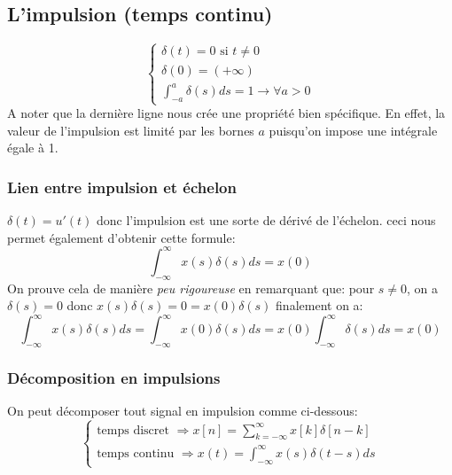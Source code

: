 \documentclass{report}
\begin{document}
\subsection{L'impulsion (temps continu)}
\begin{equation}
\begin{cases}
\delta (t) = 0 \text{ si } t \neq 0\\
\delta (0) = (+\infty)\\
\int_{-a}^a \delta (s) ds = 1 \rightarrow \forall a > 0
\end{cases}
\end{equation}
A noter que la dernière ligne nous crée une propriété bien spécifique. En effet, la valeur de l'impulsion est limité par les bornes $a$ puisqu'on impose une intégrale égale à 1.

\subsubsection{Lien entre impulsion et échelon}
$\delta (t) = u'(t)$ donc l'impulsion est une sorte de dérivé de l'échelon. ceci nous permet également d'obtenir cette formule:
\begin{equation}
\int_{-\infty}^{\infty} x(s) \delta(s)ds = x(0)
\end{equation}
On prouve cela de manière \textit{peu rigoureuse} en remarquant que: pour $s \neq 0$, on a $\delta(s) = 0$ donc $x(s)\delta(s) = 0 = x(0)\delta(s)$ finalement on a:
\begin{equation}
\int_{-\infty}^{\infty} x(s) \delta(s)ds = \int_{-\infty}^{\infty} x(0) \delta(s)ds = x(0) \int_{-\infty}^{\infty} \delta(s)ds = x(0)
\end{equation} 

\subsubsection{Décomposition en impulsions}
On peut décomposer tout signal en impulsion comme ci-dessous:
\begin{equation}
\begin{cases}
\text{temps discret } \Rightarrow x[n] = \sum_{k=-\infty}^{\infty}x[k]\delta[n-k] \\
\text{temps continu } \Rightarrow x(t) = \int_{-\infty}^{\infty} x(s) \delta(t-s)ds
\end{cases}
\end{equation}
\end{document}

